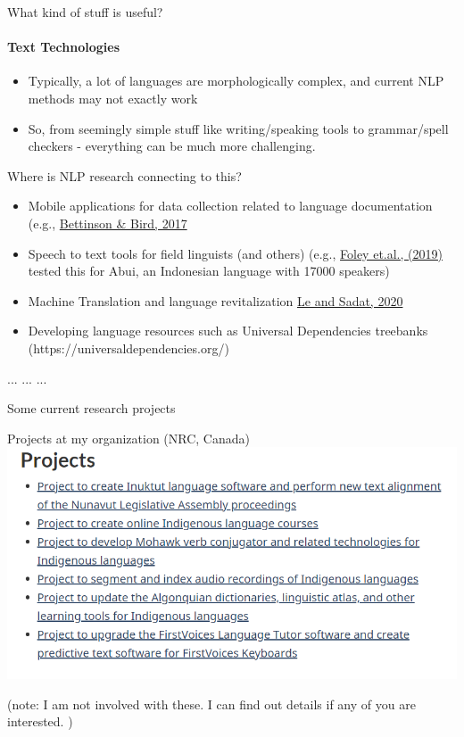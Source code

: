 \documentclass{beamer}
\begin{document}
\begin{frame}{What kind of stuff is useful?}
\framesubtitle{Text Technologies}
    \begin{itemize}
    \item Typically, a lot of languages are morphologically complex, and current NLP methods may not exactly work
    \item So, from seemingly simple stuff like writing/speaking tools to grammar/spell checkers - everything can be much more challenging. 
    \end{itemize}
\end{frame}

\begin{frame}{Where is NLP research connecting to this?}
    \begin{itemize}
        \item Mobile applications for data collection related to language documentation (e.g., \href{https://www.aclweb.org/anthology/W17-0121/}{Bettinson \& Bird, 2017}
        \item Speech to text tools for field linguists (and others) (e.g., \href{https://isca-speech.org/archive/Interspeech_2019/pdfs/8006.pdf}{Foley et.al., (2019)} tested this for Abui, an Indonesian language with 17000 speakers)
        \item Machine Translation and language revitalization \href{https://www.aclweb.org/anthology/2020.coling-main.410/}{Le and Sadat, 2020}
        \item Developing language resources such as Universal Dependencies treebanks (https://universaldependencies.org/) 
    \end{itemize}
    ... ... ...
\end{frame}

\begin{frame}{}
    \Large Some current research projects
\end{frame}

\begin{frame}{Projects at my organization (NRC, Canada)}
    \includegraphics[width=\textwidth]{figures/ILT.PNG}
    
    (note: I am not involved with these. I can find out details if any of you are interested. )
\end{frame}
\end{document}
